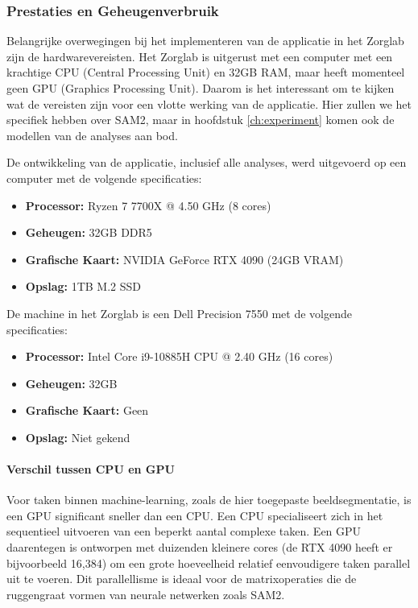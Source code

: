 \subsubsection{Prestaties en Geheugenverbruik}

Belangrijke overwegingen bij het implementeren van de applicatie in het Zorglab zijn de hardwarevereisten.
Het Zorglab is uitgerust met een computer met een krachtige CPU (Central Processing Unit) en 32GB RAM, maar heeft momenteel geen GPU (Graphics Processing Unit).
Daarom is het interessant om te kijken wat de vereisten zijn voor een vlotte werking van de applicatie.
Hier zullen we het specifiek hebben over SAM2, maar in hoofdstuk \ref{ch:experiment} komen ook de modellen van de analyses aan bod.

De ontwikkeling van de applicatie, inclusief alle analyses, werd uitgevoerd op een computer met de volgende specificaties:
\begin{itemize}
    \item \textbf{Processor:} Ryzen 7 7700X @ 4.50 GHz (8 cores)
    \item \textbf{Geheugen:} 32GB DDR5
    \item \textbf{Grafische Kaart:} NVIDIA GeForce RTX 4090 (24GB VRAM)
    \item \textbf{Opslag:} 1TB M.2 SSD
\end{itemize}

De machine in het Zorglab is een Dell Precision 7550 met de volgende specificaties:
\begin{itemize}
    \item \textbf{Processor:} Intel Core i9-10885H CPU @ 2.40 GHz (16 cores)
    \item \textbf{Geheugen:} 32GB
    \item \textbf{Grafische Kaart:} Geen
    \item \textbf{Opslag:} Niet gekend %
\end{itemize}

\paragraph{Verschil tussen CPU en GPU}
Voor taken binnen machine-learning, zoals de hier toegepaste beeldsegmentatie, is een GPU significant sneller dan een CPU. 
Een CPU specialiseert zich in het sequentieel uitvoeren van een beperkt aantal complexe taken. 
Een GPU daarentegen is ontworpen met duizenden kleinere cores (de RTX 4090 heeft er bijvoorbeeld 16,384) 
om een grote hoeveelheid relatief eenvoudigere taken parallel uit te voeren. 
Dit parallellisme is ideaal voor de matrixoperaties die de ruggengraat vormen van neurale netwerken zoals SAM2.

